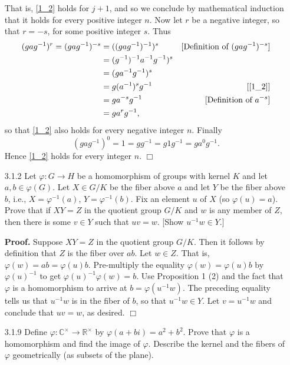\documentclass[9pt]{article}
\newcommand{\qed}{\hfill \ensuremath{\Box}}
\newcommand{\C}{\mathbb{C}}
\newcommand{\R}{\mathbb{R}}
\begin{document}
\begin{enumerate}
                  That is, \eqref{1_2} holds for $j+1$, and so we conclude by
                  mathematical induction that it holds for every positive
                  integer $n$. Now let $r$ be a negative integer, so that
                  $r = -s$, for some positive integer $s$. Thus
                  \begin{align*}
                     (gag^{-1})^r = (gag^{-1})^{-s} &= ((gag^{-1})^{-1})^s
                        &[\text{Definition of }(gag^{-1})^{-s}] \\
                        &= (g^{-1})^{-1}a^{-1}g^{-1})^s \\
                        &= (ga^{-1}g^{-1})^s \\
                        &= g(a^{-1})^sg^{-1} &[\eqref{1_2}] \\
                        &= ga^{-s}g^{-1} &[\text{Definition of }a^{-s}] \\
                        &= ga^rg^{-1},
                  \end{align*}
                  so that \eqref{1_2} also holds for every negative integer $n$.
                  Finally
                  $$(gag^{-1})^0 = 1 = gg^{-1} = g1g^{-1} = ga^0g^{-1}.$$
                  Hence \eqref{1_2} holds for every integer $n$. \qed
   \item[3.1.2]   Let $\varphi : G \rightarrow H$ be a homomorphism of groups 
                  with kernel $K$ and let $a, b \in \varphi(G)$. Let $X \in G/K$ 
                  be the  fiber above $a$ and let $Y$ be the fiber above $b$, 
                  i.e., $X = \varphi^{-1}(a)$, $Y = \varphi^{-1}(b)$. Fix an 
                  element $u$ of $X$ (so $\varphi(u) = a$). Prove that if
                  $XY = Z$ in the quotient group $G/K$ and $w$ is any member of 
                  $Z$, then there is some $v \in Y$ such that $uv = w$.
                  [Show $u^{-1}w \in Y$.]
                  
      \textbf{Proof.} Suppose $XY = Z$ in the quotient group $G/K$. Then it
      follows by definition that $Z$ is the fiber over $ab$. Let $w \in Z$.
      That is, $\varphi(w) = ab = \varphi(u)b$. Pre-multiply the equality
      $\varphi(w) = \varphi(u)b$ by $\varphi(u)^{-1}$ to get
      $\varphi(u)^{-1}\varphi(w) = b$. Use Proposition 1 (2) and the fact that
      $\varphi$ is a homomorphism to arrive at $b = \varphi(u^{-1}w)$. The
      preceding equality tells us that $u^{-1}w$ is in the fiber of $b$, so that
      $u^{-1}w \in Y$. Let $v = u^{-1}w$ and conclude that $uv = w$, as desired.
      \qed
   \item[3.1.9]   Define $\varphi : \C^\times \rightarrow \R^\times$ by
                  $\varphi(a + bi) = a^2 + b^2$. Prove that $\varphi$ is a
                  homomorphism and find the image of $\varphi$. Describe the
                  kernel and the fibers of $\varphi$ geometrically (as subsets
                  of the plane).
                  

\end{enumerate}
\end{document}
